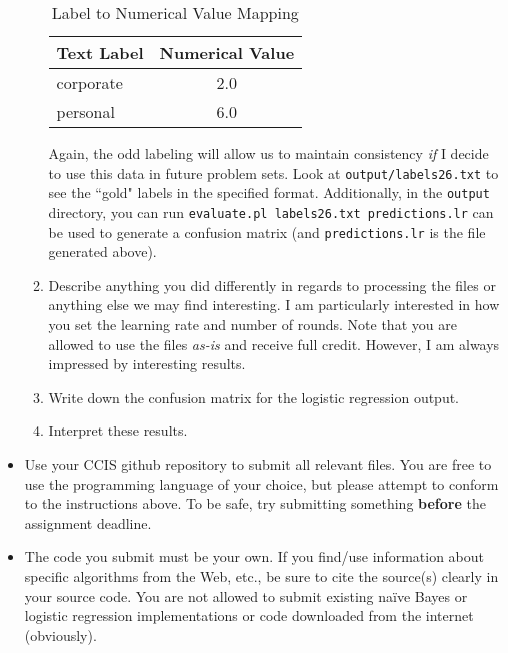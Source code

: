 \documentclass[12pt,letterpaper]{article}
\begin{document}
\begin{enumerate}
\begin{enumerate}
\begin{table}[htb]
\centering
\begin{tabular}{|l|c|}
\hline
Text Label & Numerical Value \\
\hline
corporate & 2.0 \\
personal & 6.0 \\
\hline
\end{tabular}
\caption{Label to Numerical Value Mapping}
\label{table:mapping}
\end{table}

Again, the odd labeling will allow us to maintain consistency {\em if} I decide to use this data in future problem sets.  Look at {\tt output/labels26.txt} to see the ``gold" labels in the specified format.  Additionally, in the {\tt output} directory, you can run {\tt evaluate.pl labels26.txt predictions.lr} can be used to generate a confusion matrix (and {\tt predictions.lr} is the file generated above). 

\item
Describe anything you did differently in regards to processing the files or anything else we may find interesting.  I am particularly interested in how you set the learning rate and number of rounds. Note that you are allowed to use the files {\em as-is} and receive full credit.  However, I am always impressed by interesting results.

\item
Write down the confusion matrix for the logistic regression output.

\item
Interpret these results.


\end{enumerate}

\end{enumerate}

\begin{itemize}
\item
Use your CCIS github repository to submit all relevant files.  You are free to use the programming language of your choice, but please attempt to conform to the instructions above.  To be safe, try submitting something {\bf before} the assignment deadline.

\item
The code you submit must be your own. If you find/use information about specific algorithms from the Web, etc., be sure to cite the source(s) clearly in your source code.  You are not allowed to submit existing na\"{i}ve Bayes or logistic regression implementations or code downloaded from the internet (obviously).
\end{itemize}
\end{document}
